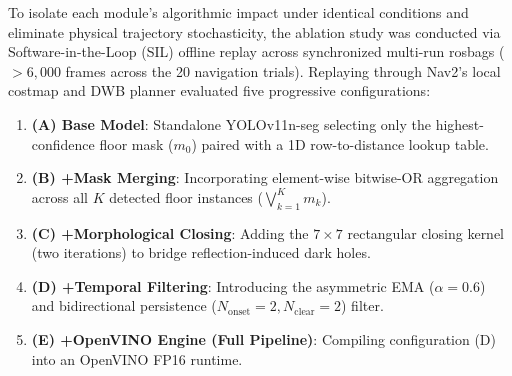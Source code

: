 \documentclass{ieeeaccess}
\begin{document}
To isolate each module's algorithmic impact under identical conditions and eliminate physical trajectory stochasticity, the ablation study was conducted via Software-in-the-Loop (SIL) offline replay across synchronized multi-run rosbags ($>6{,}000$ frames across the 20 navigation trials). Replaying through Nav2's local costmap and DWB planner evaluated five progressive configurations:
\begin{enumerate}
  \item \textbf{(A) Base Model}: Standalone YOLOv11n-seg selecting only the highest-confidence floor mask ($m_0$) paired with a 1D row-to-distance lookup table.
  \item \textbf{(B) +Mask Merging}: Incorporating element-wise bitwise-OR aggregation across all $K$ detected floor instances ($\bigvee_{k=1}^K m_k$).
  \item \textbf{(C) +Morphological Closing}: Adding the $7 \times 7$ rectangular closing kernel (two iterations) to bridge reflection-induced dark holes.
  \item \textbf{(D) +Temporal Filtering}: Introducing the asymmetric EMA ($\alpha=0.6$) and bidirectional persistence ($N_{\mathrm{onset}}=2, N_{\mathrm{clear}}=2$) filter.
  \item \textbf{(E) +OpenVINO Engine (Full Pipeline)}: Compiling configuration (D) into an OpenVINO FP16 runtime.
\end{enumerate}
\end{document}
